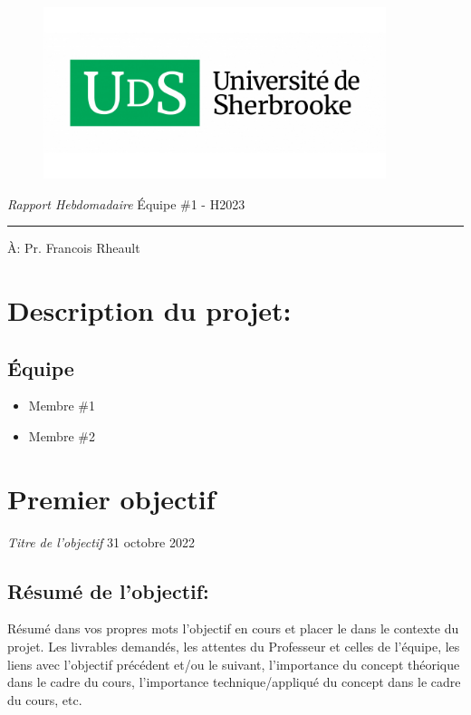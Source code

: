 \documentclass{article}
\begin{document}
\begin{figure}[htp]
    \centering
    \includegraphics[width=10cm]{fig/uds_logo.jpg}
\end{figure}
\noindent
{\large {\em Rapport Hebdomadaire} \hfill Équipe \#1 - H2023\\}

\noindent
{\color{cute_green} \rule{\linewidth}{0.5mm} }

\noindent
{\large À: Pr. Francois Rheault}
\noindent

\section{Description du projet:}


\subsection{Équipe}
\begin{itemize}
    \item Membre \#1
    \item Membre \#2
\end{itemize}


\section{Premier objectif}
{\large {\em Titre de l'objectif} \hfill 31 octobre 2022\\}
\subsection{Résumé de l'objectif:}
Résumé dans vos propres mots l'objectif en cours et placer le dans le contexte du projet. Les livrables demandés, les attentes du Professeur et celles de l'équipe, les liens avec l'objectif précédent et/ou le suivant, l'importance du concept théorique \cite{koehler2022ungrading} dans le cadre du cours, l'importance technique/appliqué du concept dans le cadre du cours, etc.
\end{document}
